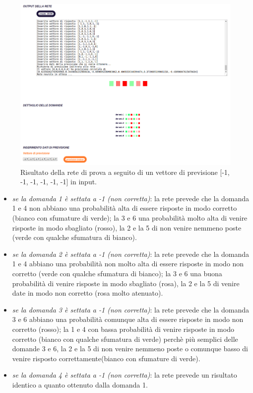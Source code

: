 \begin{itemize}
\begin{figure}[H]
\centering
	\includegraphics[width=0.90\linewidth]{./image/rete_prova-vpmeno1.png}
	\caption{Risultato della rete di prova a seguito di un vettore di previsione [-1, -1, -1, -1, -1, -1] in input.}
\end{figure}
\begin{itemize}
\item \textit{se la domanda 1 \`e settata a -1 (non corretta)}: la rete prevede che la domanda 1 e 4 non abbiano una probabilit\`a alta di essere risposte in modo corretto (bianco con sfumature di verde); la 3 e 6 una probabilit\`a molto alta di venire risposte in modo sbagliato (rosso), la 2 e la 5 di non venire nemmeno poste (verde con qualche sfumatura di bianco).
\item \textit{se la domanda 2 \`e settata a -1 (non corretta)}: la rete prevede che la domanda 1 e 4 abbiano una probabilit\`a non molto alta di essere risposte in modo non corretto (verde con qualche sfumatura di bianco); la 3 e 6 una buona probabilit\`a di venire risposte in modo sbagliato (rosa), la 2 e la 5 di venire date in modo non corretto (rosa molto atenuato).
\item \textit{se la domanda 3 \`e settata a -1 (non corretta)}: la rete prevede che la domanda 3 e 6 abbiano una probabilit\`a comunque alta di essere risposte in modo non corretto (rosso); la 1 e 4 con bassa probabilit\`a di venire risposte in modo corretto (bianco con qualche sfumatura di verde) perch\`e pi\`u semplici delle domande 3 e 6, la 2 e la 5 di non venire nemmeno poste o comunque basso di venire risposto correttamente(bianco con sfumature di verde).
\item \textit{se la domanda 4 \`e settata a -1 (non corretta)}: la rete prevede un risultato  identico a quanto ottenuto dalla domanda 1.

\end{itemize}
\end{itemize}
